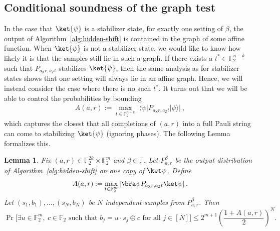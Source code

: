 \documentclass[11pt]{article}
\newtheorem{lemma}[theorem]{Lemma}
\newcommand{\Z}{\mathsf{Z}}
\newcommand{\X}{\mathsf{X}}
\newcommand{\F}{\mathbb{F}}
\begin{document}
\subsection{Conditional soundness of the graph test}

In the case that $\ket{\psi}$ is a stabilizer state, for exactly one setting of $\beta$, the output of Algorithm~\ref{alg:hidden-shift} is contained in the graph of some affine function. When $\ket{\psi}$ is not a stabilizer state, we would like to know how likely it is that the samples still lie in such a graph. If there exists a $t^* \in \F_2^{n-k}$ such that $P_{a_\X r, a_\Z t}$ stabilizes $\ket{\psi}$, then the same analysis as for stabilizer states shows that one setting will always lie in an affine graph. Hence, we will instead consider the case where there is no such $t^*$. It turns out that we will be able to control the probabilities by bounding
\begin{align}
    A(a,r) := \max_{t\in \F_2^{n-k}} \vert \langle \psi \vert P_{a_\X r, a_\Z t}\vert \psi\rangle \vert\ ,
\end{align}
which captures the closest that all completions of $(a,r)$ into a full Pauli string can come to stabilizing $\ket{\psi}$ (ignoring phases). The following Lemma formalizes this.

\begin{lemma}
\label{lem:hidden-shift-soundness}
Fix $(a,r)\in\F_2^{2k}\times\F_2^m$ and $\beta\in\F$.  Let
$P^\beta_{a,r}$ be the output distribution of Algorithm~\ref{alg:hidden-shift}
on one copy of $\ket\psi$.  Define
$$
    A(a,r):=\max_{t\in\F_2^m}
    \left|\bra\psi P_{a_\X r, a_\Z t}\ket\psi\right|.
$$
Let $(s_1,b_1),\ldots,(s_N,b_N)$ be $N$ independent samples from
$P^\beta_{a,r}$.  Then
$$
    \Pr\Big[\exists u\in\F_2^m,\ c\in\F_2
    \text{ such that } b_j=u\cdot s_j\oplus c\text{ for all }j\in[N]\Big]
    \le 2^{m+1}\left(\frac{1+A(a,r)}2\right)^N.
$$
\end{lemma}
\end{document}
